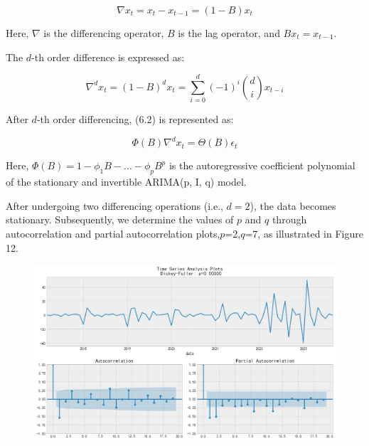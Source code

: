 \documentclass{apmcmthesis}
\begin{document}
\[ \nabla x_t = x_t - x_{t-1} = (1 - B)x_t \]

Here, \(\nabla\) is the differencing operator, \(B\) is the lag operator, and \(Bx_t = x_{t-1}\).

The \(d\)-th order difference is expressed as:

\[ \nabla^d x_t = (1 - B)^d x_t = \sum_{i=0}^{d} (-1)^i \binom{d}{i} x_{t-i} \]

After \(d\)-th order differencing, (6.2) is represented as:

\[ \Phi(B) \nabla^d x_t = \Theta(B) \epsilon_t \]

Here, \(\Phi(B) = 1 - \phi_1 B - \ldots - \phi_p B^p\) is the autoregressive coefficient polynomial of the stationary and invertible ARIMA(p, I, q) model.

After undergoing two differencing operations (i.e., \(d = 2\)), the data becomes stationary. Subsequently, we determine the values of \(p\) and \(q\) through autocorrelation and partial autocorrelation plots,\(p\)=2,\(q\)=7, as illustrated in Figure 12.

\begin{figure}[htbp]
    \centering
    \includegraphics[scale=0.5]{figures/Figure/pd.png}
    \caption{}
\end{figure}
\end{document}
